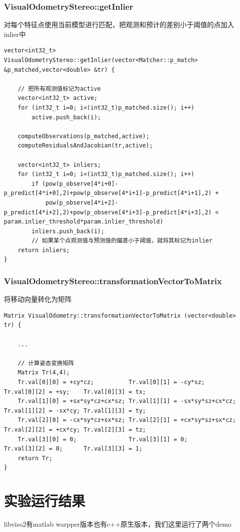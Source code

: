 \documentclass[UTF8]{ctexart}
\begin{document}
    \subsubsection{VisualOdometryStereo::getInlier}
    对每个特征点使用当前模型进行匹配，把观测和预计的差别小于阈值的点加入inlier中
    \begin{verbatim}
vector<int32_t> VisualOdometryStereo::getInlier(vector<Matcher::p_match> &p_matched,vector<double> &tr) {

    // 把所有观测值标记为active
    vector<int32_t> active;
    for (int32_t i=0; i<(int32_t)p_matched.size(); i++)
        active.push_back(i);

    computeObservations(p_matched,active);
    computeResidualsAndJacobian(tr,active);

    vector<int32_t> inliers;
    for (int32_t i=0; i<(int32_t)p_matched.size(); i++)
        if (pow(p_observe[4*i+0]-p_predict[4*i+0],2)+pow(p_observe[4*i+1]-p_predict[4*i+1],2) +
            pow(p_observe[4*i+2]-p_predict[4*i+2],2)+pow(p_observe[4*i+3]-p_predict[4*i+3],2) < param.inlier_threshold*param.inlier_threshold)
        inliers.push_back(i);
        // 如果某个点观测值与预测值的偏差小于阈值，就将其标记为inlier
    return inliers;
}
    \end{verbatim}
    \subsubsection{VisualOdometryStereo::transformationVectorToMatrix}
    将移动向量转化为矩阵
    \begin{verbatim}
Matrix VisualOdometry::transformationVectorToMatrix (vector<double> tr) {

    ...

    // 计算姿态变换矩阵
    Matrix Tr(4,4);
    Tr.val[0][0] = +cy*cz;          Tr.val[0][1] = -cy*sz;          Tr.val[0][2] = +sy;    Tr.val[0][3] = tx;
    Tr.val[1][0] = +sx*sy*cz+cx*sz; Tr.val[1][1] = -sx*sy*sz+cx*cz; Tr.val[1][2] = -sx*cy; Tr.val[1][3] = ty;
    Tr.val[2][0] = -cx*sy*cz+sx*sz; Tr.val[2][1] = +cx*sy*sz+sx*cz; Tr.val[2][2] = +cx*cy; Tr.val[2][3] = tz;
    Tr.val[3][0] = 0;               Tr.val[3][1] = 0;               Tr.val[3][2] = 0;      Tr.val[3][3] = 1;
    return Tr;
}
    \end{verbatim}
    \section{实验运行结果}
    libviso2有matlab warpper版本也有c++原生版本，我们这里运行了两个demo
\end{document}
